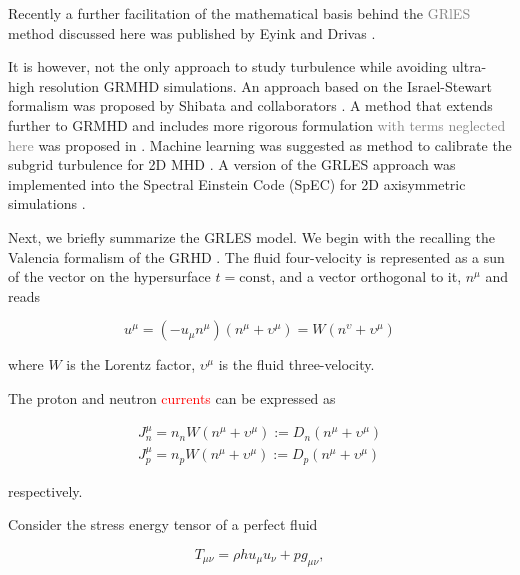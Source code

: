 \documentclass[11pt,a4paper,headinclude=true,DIV=14,BCOR=8mm,chapterprefix,listof=totoc,twoside,openright,abstracton]{scrbook}
\newcommand{\red}[1]{\textcolor{red}{#1}}
\newcommand{\gray}[1]{\textcolor{gray}{#1}}
\begin{document}
Recently a further facilitation of the mathematical basis behind the \gray{GRlES} method discussed here was published by Eyink and Drivas \cite{Eyink:2017zfz}.

It is however, not the only approach to study turbulence while avoiding ultra-high resolution GRMHD simulations. An approach based on the Israel-Stewart formalism was proposed by Shibata and collaborators \cite{Shibata:2017jyf}.
A method that extends further to GRMHD and includes more rigorous formulation \gray{with terms neglected here} was proposed in \cite{Carrasco:2019uzl,Vigano:2020ouc}. 
Machine learning was suggested as method to calibrate the subgrid turbulence for 2D MHD \cite{Rosofsky:2020}. 
A version of the GRLES approach was implemented into the Spectral Einstein Code (SpEC) for 2D axisymmetric simulations \cite{Jesse:2020oss}.


Next, we briefly summarize the GRLES model. We begin with the recalling the Valencia formalism of the GRHD \cite{Banyuls:1997}. The fluid four-velocity is represented as a sun of the vector on the hypersurface $t=\text{const}$, and a vector orthogonal to it, $n^{\mu}$ and reads

\begin{equation}
u^{\mu} = (-u_{\mu}n^{\mu})(n^{\mu}+\upsilon^{\mu}) = W(n^{\upsilon} + \upsilon^{\mu})
\end{equation}

where $W$ is the Lorentz factor, $\upsilon^{\mu}$ is the fluid three-velocity.

The proton and neutron \red{currents} can be expressed as

\begin{eqnarray}
J^{\mu}_n = n_n W(n^{\mu} + \upsilon^{\mu}) := D_n (n^{\mu} + \upsilon^{\mu}) \\
J^{\mu}_p = n_p W(n^{\mu} + \upsilon^{\mu}) := D_p (n^{\mu} + \upsilon^{\mu})
\end{eqnarray}

respectively.



Consider the stress energy tensor of a perfect fluid

\begin{equation}
T_{\mu\nu} = \rho h u_{\mu} u_{\nu} + pg_{\mu\nu},
\end{equation}
\end{document}
